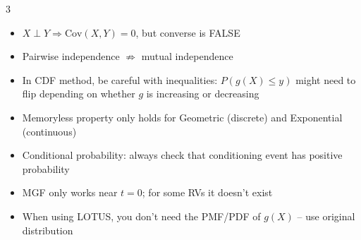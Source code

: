 \documentclass[10pt,landscape]{article}
\begin{document}
\begin{multicols}{3}
\begin{itemize}[leftmargin=*,noitemsep]
\item $X \perp Y \Rightarrow \text{Cov}(X, Y) = 0$, but converse is FALSE

\item Pairwise independence $\not\Rightarrow$ mutual independence

\item In CDF method, be careful with inequalities: $P(g(X) \leq y)$ might need to flip depending on whether $g$ is increasing or decreasing

\item Memoryless property only holds for Geometric (discrete) and Exponential (continuous)

\item Conditional probability: always check that conditioning event has positive probability

\item MGF only works near $t = 0$; for some RVs it doesn't exist

\item When using LOTUS, you don't need the PMF/PDF of $g(X)$ -- use original distribution
\end{itemize}

\end{multicols}
\end{document}
